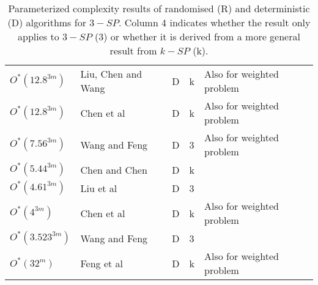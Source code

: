 \begin{table}[htp]
\begin{tabular}{lllll}
  $O^*(12.8^{3m})$     & Liu, Chen and Wang \cite{12.8mk}        & D   & k   & Also for weighted problem \\
  $O^*(12.8^{3m})$     & Chen et al \cite{SmallColorCoding}      & D   & k   & Also for weighted problem \\ %
  $O^*(7.56^{3m})$     & Wang and Feng \cite{WangFeng2}          & D   & 3   & Also for weighted problem \\
  $O^*(5.44^{3m})$     & Chen and Chen \cite{ChenChen}           & D   & k   & \\
  $O^*(4.61^{3m})$     & Liu et al \cite{GreedyLocalization}     & D   & 3   & \\
  $O^*(4^{3m})$        & Chen et al \cite{DivideAndConquer}      & D   & k   & Also for weighted problem \\ %
  $O^*(3.523^{3m})$    & Wang and Feng \cite{WangFeng1}          & D   & 3   & \\
  $O^*(32^m)$          & Feng et al \cite{WeightedParameterized} & D   & k   & Also for weighted problem \\
  \bottomrule
\end{tabular}
\caption{Parameterized complexity results of randomised (R) and deterministic (D) algorithms for $3-SP$. Column 4 indicates whether the result only applies to $3-SP$ (3) or whether it is derived from a more general result from $k-SP$ (k).}
\label{tab:3SP}
\end{table}

